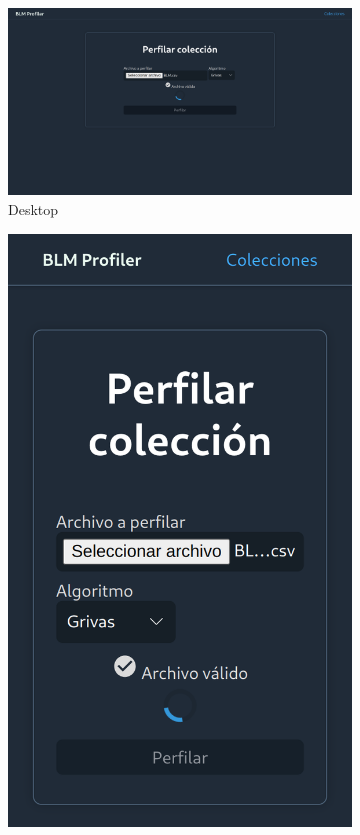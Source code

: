 \begin{figure}[H]
  \centering
  \begin{subfigure}{0.7\textwidth}
       \includegraphics[width=\textwidth]{imaxes/capturas-app/desktop/home_perfilando.png}
      \caption{Desktop} 
  \end{subfigure}
  \begin{subfigure}{0.2215\textwidth}
       \includegraphics[width=\textwidth]{imaxes/capturas-app/mobile/home_perfilando.png}

\end{subfigure}
\end{figure}
